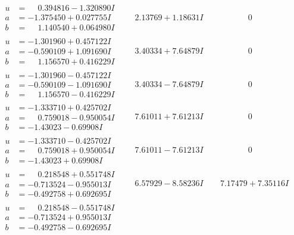 \documentclass[1p]{elsarticle_modified}
\theoremstyle{definition}
\begin{document}
$$\begin{array}{c|c|c}
\begin{aligned}
u &= \phantom{-}0.394816 - 1.320890 I \\
a &= -1.375450 + 0.027755 I \\
b &= \phantom{-}1.140540 + 0.064980 I\end{aligned}
 & \phantom{-}2.13769 + 1.18631 I & \phantom{-0.000000 } 0 \\ \hline\begin{aligned}
u &= -1.301960 + 0.457122 I \\
a &= -0.590109 + 1.091690 I \\
b &= \phantom{-}1.156570 + 0.416229 I\end{aligned}
 & \phantom{-}3.40334 + 7.64879 I & \phantom{-0.000000 } 0 \\ \hline\begin{aligned}
u &= -1.301960 - 0.457122 I \\
a &= -0.590109 - 1.091690 I \\
b &= \phantom{-}1.156570 - 0.416229 I\end{aligned}
 & \phantom{-}3.40334 - 7.64879 I & \phantom{-0.000000 } 0 \\ \hline\begin{aligned}
u &= -1.333710 + 0.425702 I \\
a &= \phantom{-}0.759018 - 0.950054 I \\
b &= -1.43023 - 0.69908 I\end{aligned}
 & \phantom{-}7.61011 + 7.61213 I & \phantom{-0.000000 } 0 \\ \hline\begin{aligned}
u &= -1.333710 - 0.425702 I \\
a &= \phantom{-}0.759018 + 0.950054 I \\
b &= -1.43023 + 0.69908 I\end{aligned}
 & \phantom{-}7.61011 - 7.61213 I & \phantom{-0.000000 } 0 \\ \hline\begin{aligned}
u &= \phantom{-}0.218548 + 0.551748 I \\
a &= -0.713524 - 0.955013 I \\
b &= -0.492758 + 0.692695 I\end{aligned}
 & \phantom{-}6.57929 - 8.58236 I & \phantom{-}7.17479 + 7.35116 I \\ \hline\begin{aligned}
u &= \phantom{-}0.218548 - 0.551748 I \\
a &= -0.713524 + 0.955013 I \\
b &= -0.492758 - 0.692695 I\end{aligned}

\end{array}$$
\end{document}
